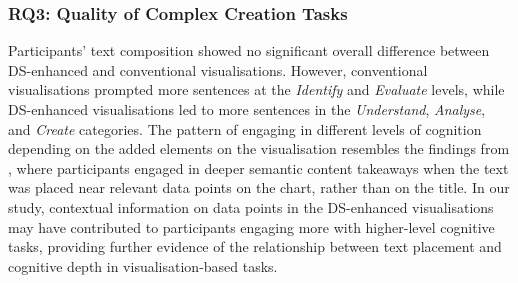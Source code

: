 \subsubsection{RQ3: Quality of Complex Creation Tasks} Participants' text composition showed no significant overall difference between DS-enhanced and conventional visualisations. However, conventional visualisations prompted more sentences at the \textit{Identify} and \textit{Evaluate} levels, while DS-enhanced visualisations led to more sentences in the \textit{Understand}, \textit{Analyse}, and \textit{Create} categories. The pattern of engaging in different levels of cognition depending on the added elements on the visualisation resembles the findings from \citet{stokes2023striking}, where participants engaged in deeper semantic content takeaways when the text was placed near relevant data points on the chart, rather than on the title.  In our study, contextual information on data points in the DS-enhanced visualisations may have contributed to participants engaging more with higher-level cognitive tasks, providing further evidence of the relationship between text placement and cognitive depth in visualisation-based tasks.

